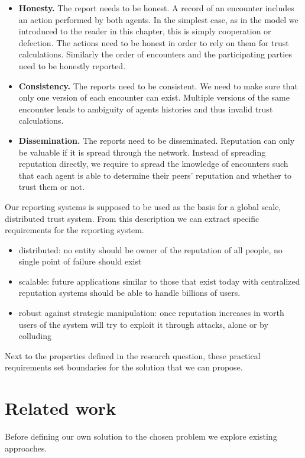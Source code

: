 \begin{itemize}
    \item \textbf{Honesty.} The report needs to be honest. A record of an encounter
    includes an action performed by both agents. In the simplest case, as in the model we introduced to
    the reader in this chapter, this is simply cooperation or defection. The actions need to be honest 
    in order to rely on them for trust calculations. Similarly the order of encounters and the participating
    parties need to be honestly reported.
    \item \textbf{Consistency.} The reports need to be consistent. We need to make 
    sure that only one version of each encounter can exist. Multiple versions of the same encounter
    leads to ambiguity of agents histories and thus invalid trust calculations.
    \item \textbf{Dissemination.} The reports need to be disseminated. Reputation can only be valuable
    if it is spread through the network. Instead of spreading reputation directly, we require to 
    spread the knowledge of encounters such that each agent is able to determine their peers' reputation
    and whether to trust them or not.
\end{itemize}

Our reporting systems is supposed to be used as the basis for a global scale, distributed trust system. 
From this description we can extract specific requirements for the reporting system.


\begin{itemize}
    \item distributed: no entity should be owner of the reputation of all people, no single point of
    failure should exist
    \item scalable: future applications similar to those that exist today with centralized reputation
    systems should be able to handle billions of users.
    \item robust against strategic manipulation: once reputation increases in worth users of the 
    system will try to exploit it through attacks, alone or by colluding
\end{itemize}

Next to the properties defined in the research question, these practical requirements set boundaries
for the solution that we can propose.

\section{Related work}
Before defining our own solution to the chosen problem we explore existing approaches.

